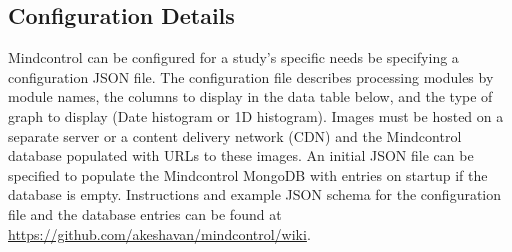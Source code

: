 \subsection{Configuration Details}

Mindcontrol can be configured for a study's specific needs be specifying a configuration JSON file. The configuration file describes processing modules by module names, the columns to display in the data table below, and the type of graph to display (Date histogram or 1D histogram). Images must be hosted on a separate server or a content delivery network (CDN) and the Mindcontrol database populated with URLs to these images. An initial JSON file can be specified to populate the Mindcontrol MongoDB with entries on startup if the database is empty. Instructions and example JSON schema for the configuration file and the database entries can be found at \url{https://github.com/akeshavan/mindcontrol/wiki}. 

